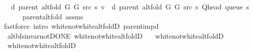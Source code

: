 \begin{isabellebody}
\ \ \ {\isachardoublequoteopen}d\ {\isacharparenleft}{\kern0pt}parent\ {\isacharparenleft}{\kern0pt}alt{\isacharunderscore}{\kern0pt}fold\ G{}\ G{}\ src\ s{\isacharparenright}{\kern0pt}{\isacharparenright}{\kern0pt}\ v\ {\isacharequal}{\kern0pt}\ d\ {\isacharparenleft}{\kern0pt}parent\ {\isacharparenleft}{\kern0pt}alt{\isacharunderscore}{\kern0pt}fold\ G{}\ G{}\ src\ s{\isacharparenright}{\kern0pt}{\isacharparenright}{\kern0pt}\ {\isacharparenleft}{\kern0pt}Q{\isacharunderscore}{\kern0pt}head\ {\isacharparenleft}{\kern0pt}queue\ s{\isacharparenright}{\kern0pt}{\isacharparenright}{\kern0pt}\ {\isacharplus}{\kern0pt}\ {}{\isachardoublequoteclose}\isanewline
%
\isadelimproof
\ \ %
\endisadelimproof
%
\isatagproof
{}\isamarkupfalse%
\ parent{\isacharunderscore}{\kern0pt}alt{\isacharunderscore}{\kern0pt}fold\ assms\isanewline
\ \ \isamarkupfalse%
\ {\isacharparenleft}{\kern0pt}fastforce\ intro{\isacharcolon}{\kern0pt}\ white{\isacharunderscore}{\kern0pt}not{\isacharunderscore}{\kern0pt}white{\isacharunderscore}{\kern0pt}alt{\isacharunderscore}{\kern0pt}foldD{\isacharparenleft}{\kern0pt}{}{\isacharparenright}{\kern0pt}\ parent{\isacharunderscore}{\kern0pt}imp{\isacharunderscore}{\kern0pt}d{\isacharparenright}{\kern0pt}%
\endisatagproof
{\isafoldproof}%
%
\isadelimproof
\isanewline
%
\endisadelimproof
\isanewline
{}\isamarkupfalse%
\ {\isacharparenleft}{\kern0pt}\ alt{\isacharunderscore}{\kern0pt}bfs{\isacharunderscore}{\kern0pt}invar{\isacharunderscore}{\kern0pt}not{\isacharunderscore}{\kern0pt}DONE{\isacharparenright}{\kern0pt}\ white{\isacharunderscore}{\kern0pt}not{\isacharunderscore}{\kern0pt}white{\isacharunderscore}{\kern0pt}alt{\isacharunderscore}{\kern0pt}foldD\ {\isacharequal}{\kern0pt}\isanewline
\ \ white{\isacharunderscore}{\kern0pt}not{\isacharunderscore}{\kern0pt}white{\isacharunderscore}{\kern0pt}alt{\isacharunderscore}{\kern0pt}foldD\isanewline
\ \ white{\isacharunderscore}{\kern0pt}not{\isacharunderscore}{\kern0pt}white{\isacharunderscore}{\kern0pt}alt{\isacharunderscore}{\kern0pt}foldD{\isacharunderscore}{\kern0pt}{}%
\isadelimdocument
%
\endisadelimdocument
%
\isatagdocument
%

\end{isabellebody}
